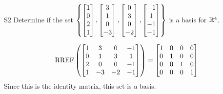 \begin{problem}{S2}
Determine if the set
\(\left\{
  \begin{bmatrix} 1 \\ 0 \\ 2 \\1 \end{bmatrix},
  \begin{bmatrix} 3 \\ 1 \\ 0 \\ -3 \end{bmatrix},
  \begin{bmatrix} 0 \\ 3 \\ 0 \\ -2 \end{bmatrix},
  \begin{bmatrix}-1 \\ 1 \\ -1 \\ -1 \end{bmatrix}
\right\}\) is a basis for \(\mathbb{R}^4\).
\end{problem}
\begin{solution}
\[\operatorname{RREF}\left(\begin{bmatrix}1 & 3 & 0 & -1 \\ 0 & 1 & 3 & 1 \\ 2 & 0 & 0 & -1 \\ 1 & -3 & -2 & -1 \end{bmatrix} \right) =\begin{bmatrix} 1 & 0 & 0 & 0 \\ 0 & 1 & 0 & 0 \\ 0 & 0 & 1 & 0 \\ 0 & 0 & 0 & 1 \end{bmatrix}\]
Since this is the identity matrix, this set is a basis.
\end{solution}
